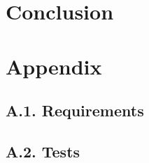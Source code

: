 \documentclass[11pt]{report}
\begin{document}
\chapter{Conclusion}


{}



\appendix

\chapter{Appendix}

\section{A.1. Requirements}

\section{A.2. Tests}
\end{document}
